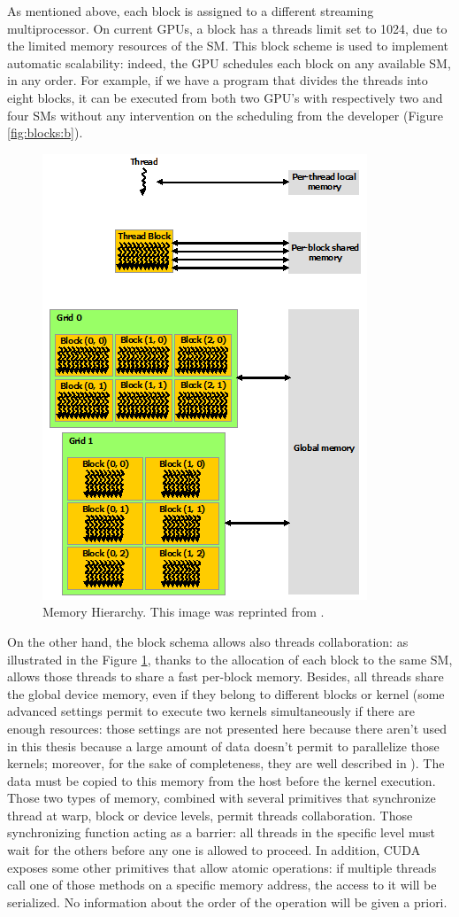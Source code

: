 As mentioned above, each block is assigned to a different streaming multiprocessor. On current GPUs, a block has a threads limit set to 1024, due to the limited memory resources of the SM. This block scheme is used to implement automatic scalability: indeed, the GPU schedules each block on any available SM, in any order. For example, if we have a program that divides the threads into eight blocks, it can be executed from both two GPU's with respectively two and four SMs without any intervention on the scheduling from the developer (Figure \ref{fig:blocks:b}).
\begin{figure}[h]
	\centering
	\includegraphics[width=0.6\linewidth]{0-resources/memory-hierarchy}
	\caption{Memory Hierarchy. This image was reprinted from \cite{cuda_manual}.}
	\label{fig:memory-hierarchy}
\end{figure}
On the other hand, the block schema allows also threads collaboration: as illustrated in the Figure \ref{fig:memory-hierarchy}, thanks to the allocation of each block to the same SM, allows those threads to share a fast per-block memory. Besides, all threads share the global device memory, even if they belong to different blocks or kernel (some advanced settings permit to execute two kernels simultaneously if there are enough resources: those settings are not presented here because there aren't used in this thesis because a large amount of data doesn't permit to parallelize those kernels; moreover, for the sake of completeness, they are well described in \cite{cuda_manual}). The data must be copied to this memory from the host before the kernel execution. Those two types of memory, combined with several primitives that synchronize thread at warp, block or device levels, permit threads collaboration. Those synchronizing function acting as a barrier: all threads in the specific level must wait for the others before any one is allowed to proceed. In addition, CUDA exposes some other primitives that allow atomic operations: if multiple threads call one of those methods on a specific memory address, the access to it will be serialized. No information about the order of the operation will be given a priori.

